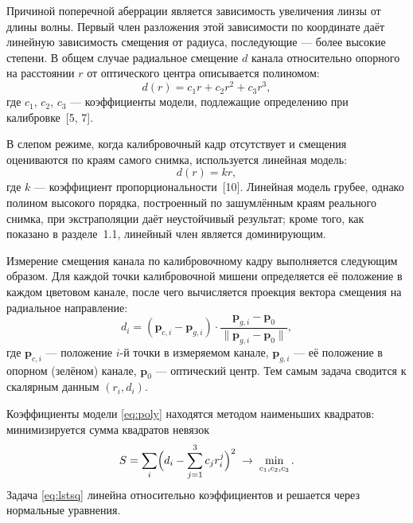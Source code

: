 \documentclass[a4paper,14pt,oneside]{extreport}
\begin{document}
Причиной поперечной аберрации является зависимость увеличения линзы от
длины волны. Первый член разложения этой зависимости по координате даёт
линейную зависимость смещения от радиуса, последующие — более высокие
степени. В общем случае радиальное смещение $d$ канала относительно
опорного на расстоянии $r$ от оптического центра описывается полиномом:
\begin{equation}
d(r) = c_1 r + c_2 r^2 + c_3 r^3,
\label{eq:poly}
\end{equation}
где $c_1$, $c_2$, $c_3$ — коэффициенты модели, подлежащие определению при
калибровке~[5, 7].

В слепом режиме, когда калибровочный кадр отсутствует и смещения
оцениваются по краям самого снимка, используется линейная модель:
\begin{equation}
d(r) = k r,
\label{eq:linear}
\end{equation}
где $k$ — коэффициент пропорциональности~[10]. Линейная модель грубее,
однако
полином высокого порядка, построенный по зашумлённым краям реального
снимка, при экстраполяции даёт неустойчивый результат; кроме того, как
показано в разделе~1.1, линейный член является доминирующим.

Измерение смещения канала по калибровочному кадру выполняется следующим
образом. Для каждой точки калибровочной мишени определяется её положение
в каждом цветовом канале, после чего вычисляется проекция вектора
смещения на радиальное направление:
\begin{equation}
d_i = (\mathbf{p}_{c,i} - \mathbf{p}_{g,i}) \cdot
      \frac{\mathbf{p}_{g,i} - \mathbf{p}_0}{\lVert \mathbf{p}_{g,i} -
      \mathbf{p}_0 \rVert},
\label{eq:proj}
\end{equation}
где $\mathbf{p}_{c,i}$ — положение $i$-й точки в измеряемом канале,
$\mathbf{p}_{g,i}$ — её положение в опорном (зелёном) канале, $\mathbf{p}_0$ —
оптический центр. Тем самым задача сводится к скалярным данным
$(r_i, d_i)$.

Коэффициенты модели \eqref{eq:poly} находятся методом наименьших
квадратов: минимизируется сумма квадратов невязок
\begin{equation}
S = \sum_i \Bigl(d_i - \sum_{j=1}^{3} c_j r_i^{j}\Bigr)^2
    \;\to\; \min_{c_1, c_2, c_3}.
\label{eq:lstsq}
\end{equation}
Задача \eqref{eq:lstsq} линейна относительно коэффициентов и решается
через нормальные уравнения.
\end{document}
